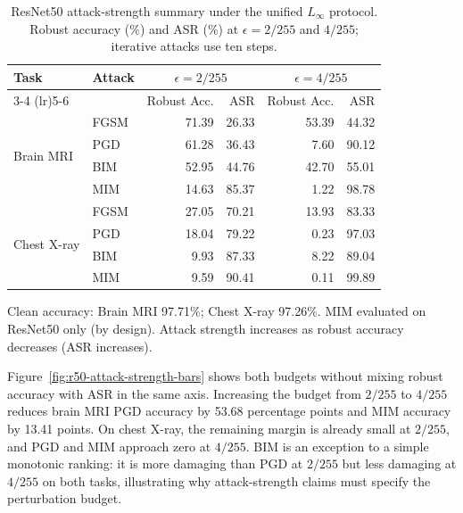 \documentclass[12pt,a4paper,oneside]{report}
\begin{document}
\begin{table}[htbp]
  \centering
  \caption{ResNet50 attack-strength summary under the unified $L_\infty$ protocol. Robust accuracy (\%) and ASR (\%) at $\epsilon = 2/255$ and $4/255$; iterative attacks use ten steps.}
  \label{tab:r50_attack_strength}
  \small
  \begin{tabular}{llrrrr}
    \toprule
    Task & Attack & \multicolumn{2}{c}{$\epsilon = 2/255$} & \multicolumn{2}{c}{$\epsilon = 4/255$} \\
    \cmidrule(lr){3-4} \cmidrule(lr){5-6}
    & & Robust Acc. & ASR & Robust Acc. & ASR \\
    \midrule
    \multirow{4}{*}{Brain MRI}
      & FGSM & 71.39 & 26.33 & 53.39 & 44.32 \\
      & PGD  & 61.28 & 36.43 &  7.60 & 90.12 \\
      & BIM  & 52.95 & 44.76 & 42.70 & 55.01 \\
      & MIM  & 14.63 & 85.37 &  1.22 & 98.78 \\
    \midrule
    \multirow{4}{*}{Chest X-ray}
      & FGSM & 27.05 & 70.21 & 13.93 & 83.33 \\
      & PGD  & 18.04 & 79.22 &  0.23 & 97.03 \\
      & BIM  &  9.93 & 87.33 &  8.22 & 89.04 \\
      & MIM  &  9.59 & 90.41 &  0.11 & 99.89 \\
    \bottomrule
  \end{tabular}
  \vspace{0.25em}
  \begin{minipage}{0.92\linewidth}
    \footnotesize
    Clean accuracy: Brain MRI 97.71\%; Chest X-ray 97.26\%.
    MIM evaluated on ResNet50 only (by design).
    Attack strength increases as robust accuracy decreases (ASR increases).
  \end{minipage}
\end{table}

Figure~\ref{fig:r50-attack-strength-bars} shows both budgets without mixing robust accuracy with ASR in the same axis. Increasing the budget from $2/255$ to $4/255$ reduces brain MRI PGD accuracy by 53.68 percentage points and MIM accuracy by 13.41 points. On chest X-ray, the remaining margin is already small at $2/255$, and PGD and MIM approach zero at $4/255$. BIM is an exception to a simple monotonic ranking: it is more damaging than PGD at $2/255$ but less damaging at $4/255$ on both tasks, illustrating why attack-strength claims must specify the perturbation budget.
\end{document}
